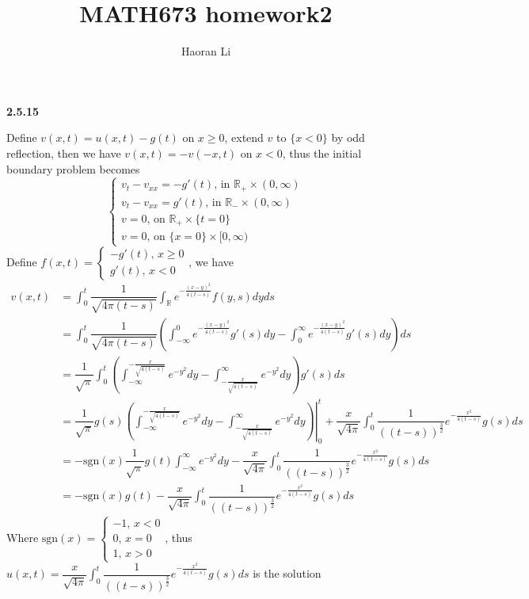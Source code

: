 \documentclass[12pt]{article}
\title{MATH673 homework2}
\author{Haoran Li}
\date{}
\begin{document}
\maketitle
\textbf{2.5.15} \par
Define $v(x,t)=u(x,t)-g(t)$ on $x\geq 0$, extend $v$ to $\{x<0\}$ by odd reflection, then we have $v(x,t)=-v(-x,t)$ on $x<0$, thus the initial boundary problem becomes
\[
\left\{\begin{matrix}
v_{t}-v_{xx}=-g'(t),\,\text{in }\mathbb{R}_{+}\times(0,\infty)\\ 
v_{t}-v_{xx}=g'(t),\,\text{in }\mathbb{R}_{-}\times(0,\infty)\\
v=0,\,\text{on }\mathbb{R}_{+}\times\{t=0\}\\ 
v=0,\,\text{on }\{x=0\}\times[0,\infty)
\end{matrix}\right.
\]
Define $f(x,t)=
\left\{\begin{matrix}
-g'(t),\,x\geq 0\\ 
g'(t),\,x<0
\end{matrix}\right.$, we have
\[
\begin{aligned}
v(x,t)
&=\int_{0}^{t}\dfrac{1}{\sqrt{4\pi(t-s)}}\int_{\mathbb{R}}e^{-\frac{(x-y)^{2}}{4(t-s)}}f(y,s)dyds \\
&=\int_{0}^{t}\dfrac{1}{\sqrt{4\pi(t-s)}}\left(\int_{-\infty}^{0}e^{-\frac{(x-y)^{2}}{4(t-s)}}g'(s)dy-\int_{0}^{\infty}e^{-\frac{(x-y)^{2}}{4(t-s)}}g'(s)dy\right)ds \\
&=\dfrac{1}{\sqrt{\pi}}\int_{0}^{t}\left(\int_{-\infty}^{-\frac{x}{\sqrt{4(t-s)}}}e^{-y^{2}}dy-\int_{-\frac{x}{\sqrt{4(t-s)}}}^{\infty}e^{-y^{2}}dy\right)g'(s)ds \\
&=\left.\dfrac{1}{\sqrt{\pi}}g(s)\left(\int_{-\infty}^{-\frac{x}{\sqrt{4(t-s)}}}e^{-y^{2}}dy-\int_{-\frac{x}{\sqrt{4(t-s)}}}^{\infty}e^{-y^{2}}dy\right)\right\vert_{0}^{t}+\dfrac{x}{\sqrt{4\pi}}\int_{0}^{t}\dfrac{1}{\left((t-s)\right)^{\frac{3}{2}}}e^{-\frac{x^{2}}{4(t-s)}}g(s)ds \\
&=-\mathrm{sgn}(x)\dfrac{1}{\sqrt{\pi}}g(t)\int_{-\infty}^{\infty}e^{-y^{2}}dy-\dfrac{x}{\sqrt{4\pi}}\int_{0}^{t}\dfrac{1}{\left((t-s)\right)^{\frac{3}{2}}}e^{-\frac{x^{2}}{4(t-s)}}g(s)ds \\
&=-\mathrm{sgn}(x)g(t)-\dfrac{x}{\sqrt{4\pi}}\int_{0}^{t}\dfrac{1}{\left((t-s)\right)^{\frac{3}{2}}}e^{-\frac{x^{2}}{4(t-s)}}g(s)ds 
\end{aligned}
\]
Where $\mathrm{sgn}(x)=\left\{\begin{matrix}
-1,\,x<0\\ 
0,\,x=0\\ 
1,\,x>0
\end{matrix}\right.$, thus $\displaystyle u(x,t)=\dfrac{x}{\sqrt{4\pi}}\int_{0}^{t}\dfrac{1}{\left((t-s)\right)^{\frac{3}{2}}}e^{-\frac{x^{2}}{4(t-s)}}g(s)ds$ is the solution \par
\end{document}
